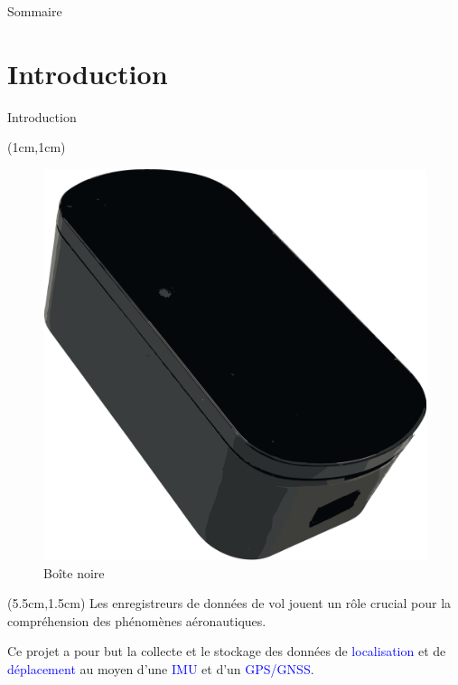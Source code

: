 \documentclass{beamer}
\begin{document}
\begin{frame}{Sommaire}
	\tableofcontents
\end{frame}

\section{Introduction}

\begin{frame}{Introduction}	
	\begin{textblock*}{4cm}(1cm,1cm) %
	\begin{figure}[h]
		\centering
		\includegraphics[width=1\linewidth]{../figures/boite-noire}
		\caption{Boîte noire}
		\label{fig:boite-noire}
	\end{figure}
	\end{textblock*}
	
	\begin{textblock*}{7cm}(5.5cm,1.5cm) %
		Les enregistreurs de données de vol jouent un rôle crucial pour la compréhension des phénomènes aéronautiques.
		
		Ce projet a pour but la collecte et le stockage des données de \textcolor{blue}{localisation} et de \textcolor{blue}{déplacement} au moyen d'une \textcolor{blue}{IMU} et d'un \textcolor{blue}{GPS/GNSS}.		
	\end{textblock*}
\end{frame}
\end{document}
